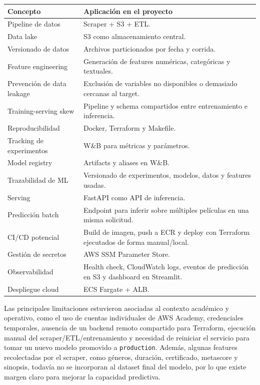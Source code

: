 \documentclass[letterpaper,12pt]{article}
\begin{document}
\begin{longtable}{p{5cm}p{11cm}}
\toprule
\textbf{Concepto} & \textbf{Aplicación en el proyecto} \\
\midrule
Pipeline de datos & Scraper + S3 + ETL. \\
Data lake & S3 como almacenamiento central. \\
Versionado de datos & Archivos particionados por fecha y corrida. \\
Feature engineering & Generación de features numéricas, categóricas y textuales. \\
Prevención de data leakage & Exclusión de variables no disponibles o demasiado cercanas al target. \\
Training-serving skew & Pipeline y schema compartidos entre entrenamiento e inferencia. \\
Reproducibilidad & Docker, Terraform y Makefile. \\
Tracking de experimentos & W\&B para métricas y parámetros. \\
Model registry & Artifacts y aliases en W\&B. \\
Trazabilidad de ML & Versionado de experimentos, modelos, datos y features usadas. \\
Serving & FastAPI como API de inferencia. \\
Predicción batch & Endpoint para inferir sobre múltiples películas en una misma solicitud. \\
CI/CD potencial & Build de imagen, push a ECR y deploy con Terraform ejecutados de forma manual/local. \\
Gestión de secretos & AWS SSM Parameter Store. \\
Observabilidad & Health check, CloudWatch logs, eventos de predicción en S3 y dashboard en Streamlit. \\
Despliegue cloud & ECS Fargate + ALB. \\
\bottomrule
\end{longtable}

Las principales limitaciones estuvieron asociadas al contexto académico y operativo, como el uso de cuentas individuales de AWS Academy, credenciales temporales, ausencia de un backend remoto compartido para Terraform, ejecución manual del scraper/ETL/entrenamiento y necesidad de reiniciar el servicio para tomar un nuevo modelo promovido a \texttt{production}. Además, algunas features recolectadas por el scraper, como géneros, duración, certificado, metascore y sinopsis, todavía no se incorporan al dataset final del modelo, por lo que existe margen claro para mejorar la capacidad predictiva.
\end{document}
